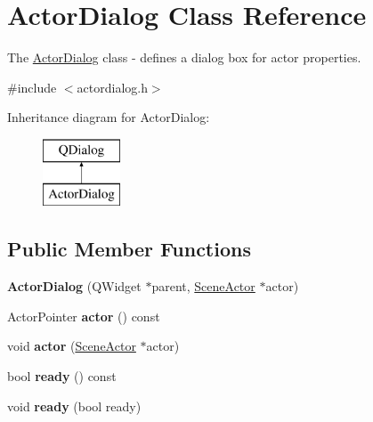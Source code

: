 \hypertarget{class_actor_dialog}{}\section{Actor\+Dialog Class Reference}
\label{class_actor_dialog}


The \hyperlink{class_actor_dialog}{Actor\+Dialog} class -\/ defines a dialog box for actor properties.  




{\ttfamily \#include $<$actordialog.\+h$>$}

Inheritance diagram for Actor\+Dialog\+:\begin{figure}[H]
\begin{center}
\leavevmode
\includegraphics[height=2.000000cm]{class_actor_dialog}
\end{center}
\end{figure}
\subsection*{Public Member Functions}
\begin{DoxyCompactItemize}
\item 
\mbox{\label{class_actor_dialog_ab9b196b4e09ea6fd4ad41968fdacc99e}} 
{\bfseries Actor\+Dialog} (Q\+Widget $\ast$parent, \hyperlink{class_actor}{Scene\+Actor} $\ast$actor)
\item 
\mbox{\label{class_actor_dialog_aef58fd474d7dd8c39d9295fab7f62e5c}} 
Actor\+Pointer {\bfseries actor} () const
\item 
\mbox{\label{class_actor_dialog_a36ecf4e16ca3ca7987fe129079f53bd4}} 
void {\bfseries actor} (\hyperlink{class_actor}{Scene\+Actor} $\ast$actor)
\item 
\mbox{\label{class_actor_dialog_a28986005a09525ecfde09f69740627df}} 
bool {\bfseries ready} () const
\item 
\mbox{\label{class_actor_dialog_a2d9c22b6725baf447224d673698ace02}} 
void {\bfseries ready} (bool ready)
\end{DoxyCompactItemize}
